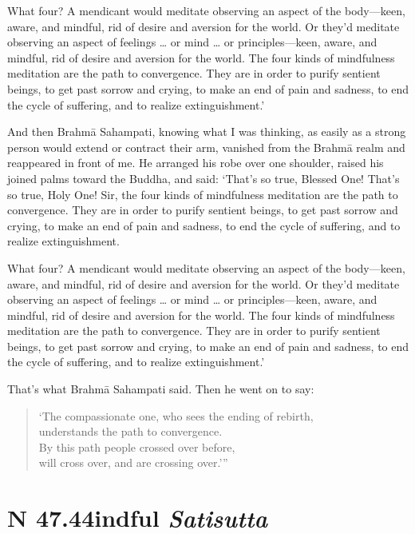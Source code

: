 \documentclass[12pt,openany]{book}%
\newcommand*{\suttatitleacronym}[1]{\smaller[2]{#1}\vspace*{.3em}}
\newcommand*{\suttatitletranslation}[1]{\linebreak{#1}}
\newcommand*{\suttatitleroot}[1]{\linebreak\smaller[2]\itshape{#1}}
\newcommand*{\tocacronym}[1]{\hspace*{-3.3em}{#1}\quad}
\newcommand*{\toctranslation}[1]{#1}
\newcommand*{\tocroot}[1]{(\textit{#1})}
\begin{document}
What four? A mendicant would meditate observing an aspect of the body—keen, aware, and mindful, rid of desire and aversion for the world. Or they’d meditate observing an aspect of feelings … or mind … or principles—keen, aware, and mindful, rid of desire and aversion for the world. The four kinds of mindfulness meditation are the path to convergence. They are in order to purify sentient beings, to get past sorrow and crying, to make an end of pain and sadness, to end the cycle of suffering, and to realize extinguishment.’ 

And then \textsanskrit{Brahmā} Sahampati, knowing what I was thinking, as easily as a strong person would extend or contract their arm, vanished from the \textsanskrit{Brahmā} realm and reappeared in front of me. He arranged his robe over one shoulder, raised his joined palms toward the Buddha, and said: ‘That’s so true, Blessed One! That’s so true, Holy One! Sir, the four kinds of mindfulness meditation are the path to convergence. They are in order to purify sentient beings, to get past sorrow and crying, to make an end of pain and sadness, to end the cycle of suffering, and to realize extinguishment. 

What four? A mendicant would meditate observing an aspect of the body—keen, aware, and mindful, rid of desire and aversion for the world. Or they’d meditate observing an aspect of feelings … or mind … or principles—keen, aware, and mindful, rid of desire and aversion for the world. The four kinds of mindfulness meditation are the path to convergence. They are in order to purify sentient beings, to get past sorrow and crying, to make an end of pain and sadness, to end the cycle of suffering, and to realize extinguishment.’ 

That’s what \textsanskrit{Brahmā} Sahampati said. Then he went on to say: 

\begin{verse}%
‘The compassionate one, who sees the ending of rebirth, \\
understands the path to convergence. \\
By this path people crossed over before, \\
will cross over, and are crossing over.’” 

%
\end{verse}

%
\section*{{\suttatitleacronym SN 47.44}{\suttatitletranslation Mindful }{\suttatitleroot Satisutta}}
\addcontentsline{toc}{section}{\tocacronym{SN 47.44} \toctranslation{Mindful } \tocroot{Satisutta}}
\end{document}
